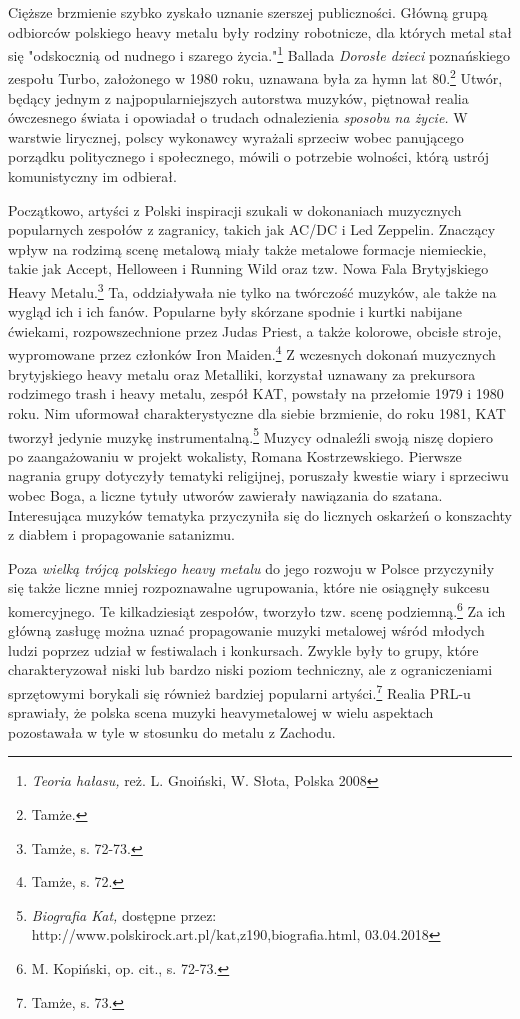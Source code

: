 \documentclass[12pt, a4paper, titlepage]{report}
\begin{document}
Cięższe brzmienie szybko zyskało uznanie szerszej publiczności. Główną grupą odbiorców polskiego heavy metalu były rodziny robotnicze, dla których metal stał się "odskocznią od nudnego i szarego życia."\footnote{\textit{Teoria hałasu,} reż. L. Gnoiński, W. Słota, Polska 2008} Ballada \textit{Dorosłe dzieci} poznańskiego zespołu Turbo, założonego w 1980 roku, uznawana była za hymn lat 80.\footnote{Tamże.} Utwór, będący jednym z najpopularniejszych autorstwa muzyków, piętnował realia ówczesnego świata i opowiadał o trudach odnalezienia \textit{sposobu na życie.} W warstwie lirycznej, polscy wykonawcy wyrażali sprzeciw wobec panującego porządku politycznego i społecznego, mówili o potrzebie wolności, którą ustrój komunistyczny im odbierał.

Początkowo, artyści z Polski inspiracji szukali w dokonaniach muzycznych popularnych zespołów z zagranicy, takich jak AC/DC i Led Zeppelin. Znaczący wpływ na rodzimą scenę metalową miały także metalowe formacje niemieckie, takie jak Accept, Helloween i Running Wild oraz tzw. Nowa Fala Brytyjskiego Heavy Metalu.\footnote{Tamże, s. 72-73.} Ta, oddziaływała nie tylko na twórczość muzyków, ale także na wygląd ich i ich fanów. Popularne były skórzane spodnie i kurtki nabijane ćwiekami, rozpowszechnione przez Judas Priest, a także kolorowe, obcisłe stroje, wypromowane przez członków Iron Maiden.\footnote{Tamże, s. 72.} Z wczesnych dokonań muzycznych brytyjskiego heavy metalu oraz Metalliki, korzystał uznawany za prekursora rodzimego trash i heavy metalu, zespół KAT, powstały na przełomie 1979 i 1980 roku. Nim uformował charakterystyczne dla siebie brzmienie, do roku 1981, KAT tworzył jedynie muzykę instrumentalną.\footnote{\textit{Biografia Kat,} dostępne przez: http://www.polskirock.art.pl/kat,z190,biografia.html, 03.04.2018} Muzycy odnaleźli swoją niszę dopiero po zaangażowaniu w projekt wokalisty, Romana Kostrzewskiego. Pierwsze nagrania grupy dotyczyły tematyki religijnej, poruszały kwestie wiary i sprzeciwu wobec Boga, a liczne tytuły utworów zawierały nawiązania do szatana. Interesująca muzyków tematyka przyczyniła się do licznych oskarżeń o konszachty z diabłem i propagowanie satanizmu. 

Poza \emph{wielką trójcą polskiego heavy metalu} do jego rozwoju w Polsce przyczyniły się także liczne mniej rozpoznawalne ugrupowania, które nie osiągnęły sukcesu komercyjnego. Te kilkadziesiąt zespołów, tworzyło tzw. scenę podziemną.\footnote{M. Kopiński, op. cit., s. 72-73.} Za ich główną zasługę można uznać propagowanie muzyki metalowej wśród młodych ludzi poprzez udział w festiwalach i konkursach. Zwykle były to grupy, które charakteryzował niski lub bardzo niski poziom techniczny, ale z ograniczeniami sprzętowymi borykali się również bardziej popularni artyści.\footnote{Tamże, s. 73.} Realia PRL-u sprawiały, że polska scena muzyki heavymetalowej w wielu aspektach pozostawała w tyle w stosunku do metalu z Zachodu.
\end{document}
